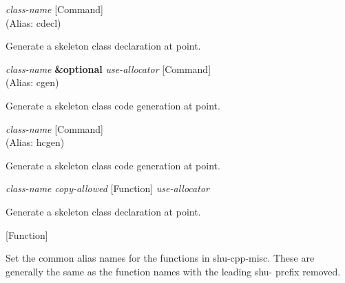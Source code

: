 \vspace{1em}
\noindent
{}
\usebox{\funcname}\emph{class-name}
 \hfill [Command]\\%
 (Alias: cdecl)

\begin{doc-string}
Generate a skeleton class declaration at point.
\end{doc-string}

\vspace{1em}
\noindent
{}
\usebox{\funcname}\emph{class-name} \textbf{\&optional} \emph{use-allocator}
 \hfill [Command]\\%
 (Alias: cgen)

\begin{doc-string}
Generate a skeleton class code generation at point.
\end{doc-string}

\vspace{1em}
\noindent
{}
\usebox{\funcname}\emph{class-name}
 \hfill [Command]\\%
 (Alias: hcgen)

\begin{doc-string}
Generate a skeleton class code generation at point.
\end{doc-string}

\vspace{1em}
\noindent
{}
\usebox{\funcname}\emph{class-name} \emph{copy-allowed}
 \hfill [Function]
\hspace*{\wd\funcname}\emph{use-allocator}

\begin{doc-string}
Generate a skeleton class declaration at point.
\end{doc-string}

\vspace{1em}
\noindent
{}
\usebox{\funcname}
 \hfill [Function]

\begin{doc-string}
Set the common alias names for the functions in shu-cpp-misc.
These are generally the same as the function names with the leading
shu- prefix removed.
\end{doc-string}


